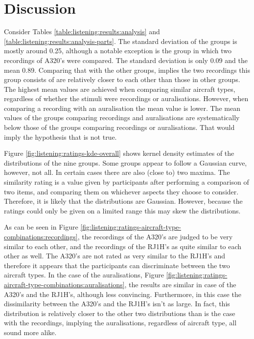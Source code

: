 \section{Discussion}
Consider Tables \ref{table:listening:results:analysis} and
\ref{table:listening:results:analysis-parts}. The standard deviation of the
groups is mostly around 0.25, although a notable exception is the group in which
two recordings of A320's were compared. The standard deviation is only 0.09 and
the mean 0.89. Comparing that with the other groups, implies the two recordings
this group consists of are relatively closer to each other than those in other
groups.
The highest mean values are achieved when comparing similar aircraft types,
regardless of whether the stimuli were recordings or auralisations. However,
when comparing a recording with an auralisation the mean value is lower. The
mean values of the groups comparing recordings and auralisations are
systematically below those of the groups comparing recordings or auralisations.
That would imply the hypothesis that  is not true.

Figure \ref{fig:listening:ratings-kde-overall} shows kernel density estimates of
the distributions of the nine groups. Some groups appear to follow a Gaussian
curve, however, not all. In certain cases there are also (close to) two maxima.
The similarity rating is a value given by participants after performing a
comparison of two items, and comparing them on whichever aspects they choose to
consider. Therefore, it is likely that the distributions are Gaussian. However,
because the ratings could only be given on a limited range this may skew the
distributions.


As can be seen in Figure
\ref{fig:listening:ratings-aircraft-type-combinations:recordings}, the recordings of the A320's
are judged to be very similar to each other, and the recordings of the RJ1H's as quite similar to
each other as well. The A320's are not rated as very similar to the RJ1H's and therefore
it appears that the participants can discriminate between the two aircraft
types.
In the case of the auralisations, Figure
\ref{fig:listening:ratings-aircraft-type-combinations:auralisations}, the
results are similar in case of the A320's and the RJ1H's, although less convincing.
Furthermore, in this case the dissimilarity between the A320's and the RJ1H's isn't as large.
In fact, this distribution is relatively closer to the other two distributions than is the case with the recordings,
implying the auralisations, regardless of aircraft type, all sound more alike.

